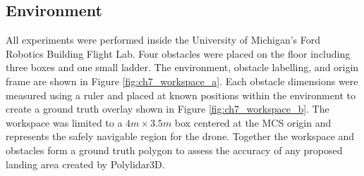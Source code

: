 \subsection{Environment}

All experiments were performed inside the University of Michigan's Ford Robotics Building Flight Lab. Four obstacles were placed on the floor including three boxes and one small ladder. The environment, obstacle labelling, and origin frame are shown in Figure \ref{fig:ch7_workspace_a}. Each obstacle dimensions were measured using a ruler and placed at known positions within the environment to create a ground truth overlay shown in Figure \ref{fig:ch7_workspace_b}. The workspace was limited to a $4m\times3.5m$ box centered at the \ac{MCS} origin and represents the safely navigable region for the drone. Together the workspace and obstacles form a ground truth polygon to assess the accuracy of any proposed landing area created by Polylidar3D.

